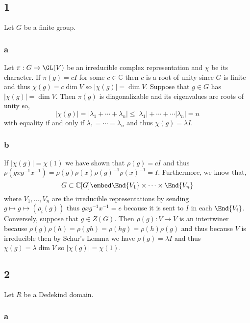 \documentclass[12pt]{article}
\renewcommand{\C}{\mathbb{C}}
\begin{document}
\subsection{1}

Let $G$ be a finite group.

\subsubsection{a}

Let $\pi : G \to \GL(V)$ be an irreducible complex representation and $\chi$ be its character. If $\pi(g) = c I$ for some $c \in \C$ then $c$ is a root of unity since $G$ is finite and thus $\chi(g) = c \dim{V}$ so $|\chi(g)| = \dim{V}$. Suppose that $g \in G$ has $|\chi(g)| = \dim{V}$. Then $\pi(g)$ is diagonalizable and its eigenvalues are roots of unity so,
\[ |\chi(g)| = |\lambda_1 + \cdots + \lambda_n| \le |\lambda_1| + \cdots + \cdots |\lambda_n| = n \]
with equality if and only if $\lambda_1 = \cdots = \lambda_n$ and thus $\chi(g) = \lambda I$.

\subsubsection{b}

If $|\chi(g)| = \chi(1)$ we have shown that $\rho(g) = c I$ and thus $\rho(g x g^{-1}x^{-1}) = \rho(g) \rho(x) \rho(g)^{-1} \rho(x)^{-1} = I$. Furthermore, we know that,
\[ G \subset \C[G] \embed \End{V_1} \times \cdots \times \End{V_n} \]
where $V_1, \dots, V_n$ are the irreducible representations by sending $g \mapsto g \mapsto (\rho_i(g))$ thus $g x g^{-1} x^{-1} = e$ because it is sent to $I$ in each $\End{V_i}$.
\bigskip\\
Conversely, suppose that $g \in Z(G)$. Then $\rho(g) : V \to V$ is an intertwiner because $\rho(g) \rho(h) = \rho(gh) = \rho(hg) = \rho(h) \rho(g)$ and thus because $V$ is irreducible then by Schur's Lemma we have $\rho(g) = \lambda I$ and thus $\chi(g) = \lambda \dim{V}$ so $|\chi(g)| = \chi(1)$.

\subsection{2}

Let $R$ be a Dedekind domain.

\subsubsection{a}
\end{document}
